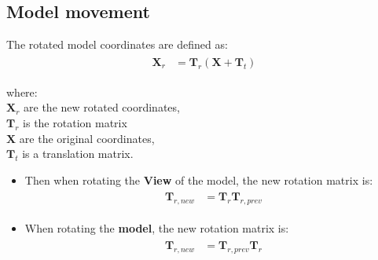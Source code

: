 \documentclass[10pt,b5paper,titlepage]{book}
\begin{document}
\subsection{Model movement}
The rotated model coordinates are defined as:
\begin{eqnarray}
    \begin{aligned}
        \mathbf{X}_r &= \mathbf{T}_r (\mathbf{X} + \mathbf{T}_t)
    \end{aligned}
\end{eqnarray}

where: \\
$ \mathbf{X}_r $ are the new rotated coordinates, \\
$ \mathbf{T}_r $ is the rotation matrix \\
$ \mathbf{X} $ are the original coordinates, \\
$ \mathbf{T}_t $ is a translation matrix.


\begin{itemize}
    \item Then when rotating the \textbf{View} of the model, the new rotation matrix is:
        \begin{eqnarray}
            \begin{aligned}
                \mathbf{T}_{r,new} &= \mathbf{T}_{r} \mathbf{T}_{r,prev}
            \end{aligned}
        \end{eqnarray}

    \item When rotating the \textbf{model}, the new rotation matrix is:
        \begin{eqnarray}
            \begin{aligned}
                \mathbf{T}_{r,new} &= \mathbf{T}_{r,prev} \mathbf{T}_{r}
            \end{aligned}
        \end{eqnarray}
\end{itemize}
\end{document}
